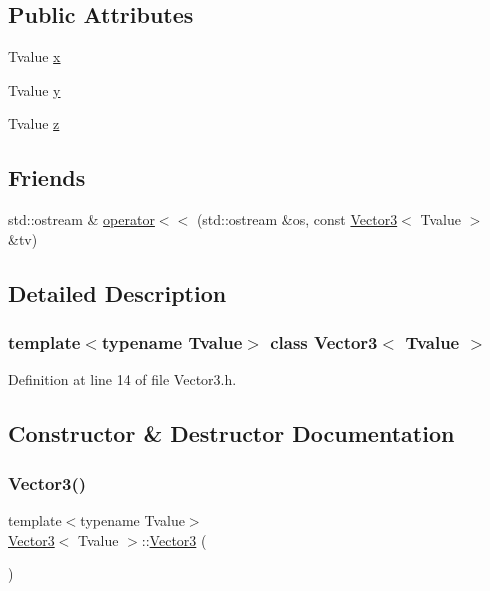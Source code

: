 \subsection*{Public Attributes}
\begin{DoxyCompactItemize}
\item 
Tvalue \hyperlink{class_vector3_ab6ece7df9cac25e4bf84335c4c5e2a57}{x}
\item 
Tvalue \hyperlink{class_vector3_a5742639cebe5b4750358cd08ee8835b6}{y}
\item 
Tvalue \hyperlink{class_vector3_a6d9eb4a6396bd9bbb246657b624717ae}{z}
\end{DoxyCompactItemize}
\subsection*{Friends}
\begin{DoxyCompactItemize}
\item 
std\+::ostream \& \hyperlink{class_vector3_a6faebe784277908a475d6a10cb1f45b3}{operator$<$$<$} (std\+::ostream \&os, const \hyperlink{class_vector3}{Vector3}$<$ Tvalue $>$ \&tv)
\end{DoxyCompactItemize}


\subsection{Detailed Description}
\subsubsection*{template$<$typename Tvalue$>$\newline
class Vector3$<$ Tvalue $>$}



Definition at line 14 of file Vector3.\+h.



\subsection{Constructor \& Destructor Documentation}
\mbox{\label{class_vector3_a1ab223d942be7732183ee116accb4801}} 
\subsubsection{\texorpdfstring{Vector3()}{Vector3()}\hspace{0.1cm}{\footnotesize\ttfamily [1/3]}}
{\footnotesize\ttfamily template$<$typename Tvalue$>$ \\
\hyperlink{class_vector3}{Vector3}$<$ Tvalue $>$\+::\hyperlink{class_vector3}{Vector3} (\begin{DoxyParamCaption}{ }\end{DoxyParamCaption})\hspace{0.3cm}{\ttfamily [inline]}}



